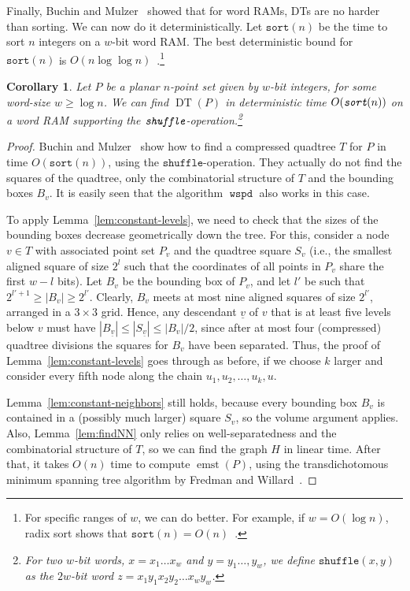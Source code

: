 \documentclass[11pt]{paper}
\DeclareMathOperator {\wspd}{\texttt{wspd}}
\DeclareMathOperator {\emst}{emst}
\DeclareMathOperator {\DT}{DT}
\newcommand {\child} {\underline}
\newtheorem {cor}[theorem] {Corollary}
\begin{document}
  Finally, Buchin and Mulzer~\cite{BuchinMu11} 
  showed that for word RAMs, DTs are no harder than sorting. 
  We can now do it deterministically.
  Let $\texttt{sort}(n)$ be the time to sort $n$ integers
  on a $w$-bit word RAM. The best deterministic bound
  for $\texttt{sort}(n)$ is 
  $O(n \log\log n)$~\cite{Han04}.\footnote{For specific ranges of $w$, 
  we can do better.
  For example, if $w = O(\log n)$,  radix sort shows
  that $\texttt{sort}(n) = O(n)$~\cite{CormenLeRiSt09}.}
  \begin {cor}\label{cor:wramDT}
     Let $P$ be a planar $n$-point set given by $w$-bit integers, for some 
     word-size $w \geq \log n$. 
     We can find $\DT(P)$ in deterministic time $O(\emph{\texttt{sort}}(n))$ on
     a word RAM supporting the 
     $\emph{\texttt{shuffle}}$-operation.\footnote{For two $w$-bit words,
     $x = x_1 \ldots x_w$ and $y = y_1 \ldots, y_w$, we define
     $\texttt{shuffle}(x,y)$ as the $2w$-bit word
     $z = x_1 y_1 x_2 y_2 \ldots x_wy_w$.}
  \end {cor}

\begin{proof}
      Buchin and Mulzer~\cite{BuchinMu11} show how to find a
      compressed quadtree $T$  for $P$ in time $O(\texttt{sort}(n))$,
      using the $\texttt{shuffle}$-operation. They actually do not
      find the squares of the quadtree, only the combinatorial
      structure of $T$ and the bounding boxes $B_v$.  It is
      easily seen that the algorithm $\wspd$ also works
      in this case.

      To apply Lemma~\ref{lem:constant-levels}, we need to check that
      the sizes of the bounding boxes decrease geometrically down the
      tree. For this, consider a node $v \in T$ with associated point
      set $P_v$ and the quadtree square $S_v$ (i.e., the smallest aligned
      square of size $2^{l}$ such that the coordinates of all points
      in $P_v$ share the first $w-l$ bits). Let $B_v$ be the bounding box
      of $P_v$, and let $l'$ be such that $2^{l'+1} \geq |B_v| \geq 2^{l'}$.
      Clearly, $B_v$ meets at most nine aligned squares of size $2^{l'}$,
      arranged in a $3 \times 3$ grid. Hence, any descendant $\child v$ of
      $v$ that is at least five levels below $v$ must have
      $|B_{\child v}| \leq |S_{\child v}| \leq |B_v|/2$, since after at most
      four (compressed) quadtree divisions the  squares for $B_v$ have
      been separated. Thus, the proof of Lemma~\ref{lem:constant-levels}
      goes through as before, if we choose $k$ larger and
      consider every fifth node along the chain $u_1, u_2, \ldots, u_k, u$.

      Lemma~\ref{lem:constant-neighbors} still holds, because
      every bounding box $B_v$ is contained in a (possibly much
      larger) square $S_v$, so the volume argument applies.
      Also, Lemma~\ref{lem:findNN} only relies on well-separatedness
      and the combinatorial structure of $T$, so we can find
      the graph $H$ in linear time. After that, it takes $O(n)$
      time to compute $\emst(P)$, using the transdichotomous minimum
      spanning tree algorithm by Fredman and Willard~\cite{FredmanWi94}.
\end{proof}
\end{document}
